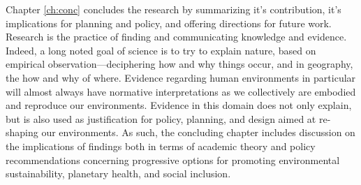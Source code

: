 Chapter \ref{ch:conc} concludes the research by summarizing it's contribution, it's implications for planning and policy, and offering directions for future work. Research is the practice of finding and communicating knowledge and evidence. Indeed, a long noted goal of science is to try to explain nature, based on empirical observation---deciphering how and why things occur, and in geography, the how and why of where. Evidence regarding human environments in particular will almost always have normative interpretations as we collectively are embodied and reproduce our environments. Evidence in this domain does not only explain, but is also used as justification for policy, planning, and design aimed at re-shaping our environments. As such, the concluding chapter includes discussion on the implications of findings both in terms of academic theory and policy recommendations concerning progressive options for promoting environmental sustainability, planetary health, and social inclusion.












